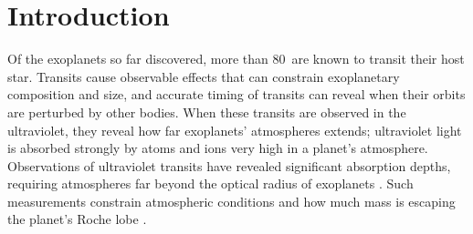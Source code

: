 \documentclass[manuscript]{aastex}
\newcommand{\numt}{80}
\begin{document}


\section{Introduction}
Of the exoplanets so far discovered, more than \numt\ are known to
transit their host star. Transits cause observable effects that can constrain exoplanetary composition and size, and accurate timing of transits can reveal when their orbits are perturbed by other bodies. When these transits are observed in the ultraviolet, they reveal how far exoplanets' atmospheres extends; ultraviolet light is absorbed strongly by atoms and ions very high in a planet's atmosphere. Observations of ultraviolet transits have revealed significant absorption depths, requiring atmospheres far beyond the optical radius of exoplanets \citep{vidmad,benjaf7,mclay,lecav,fossati}. Such measurements constrain atmospheric conditions and how much mass is escaping the planet's Roche lobe \citep{knutsonprop,gmunoz,linsky}.
\end{document}
